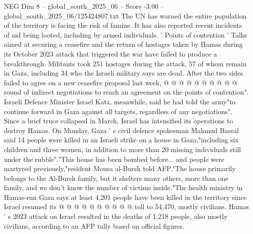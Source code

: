 \begin{textsample}{NEG Dim 8 – global\_south\_2025\_06 – Score -3.00 – global\_south\_2025\_06/125424807.txt}
The UN has warned the entire population of the territory is facing the risk of famine.
It has also reported recent incidents of aid being looted, including by armed individuals. ' Points of contention ' Talks aimed at securing a ceasefire and the return of hostages taken by Hamas during its October 2023 attack that triggered the war have failed to produce a breakthrough.
Militants took 251 hostages during the attack, 57 of whom remain in Gaza, including 34 who the Israeli military says are dead.
After the two sides failed to agree on a new ceasefire proposal last week, @ @ @ @ @ @ @ @ @ @ round of indirect negotiations to reach an agreement on the points of contention".
Israeli Defence Minister Israel Katz, meanwhile, said he had told the army"to continue forward in Gaza against all targets, regardless of any negotiations".
Since a brief truce collapsed in March, Israel has intensified its operations to destroy Hamas.
On Monday, Gaza ' s civil defence spokesman Mahmud Bassal said 14 people were killed in an Israeli strike on a house in Gaza,"including six children and three women, in addition to more than 20 missing individuals still under the rubble"."This house has been bombed before... and people were martyred previously,"resident Mousa al-Bursh told AFP."The house primarily belongs to the Al-Bursh family, but it shelters many others, more than one family, and we don't know the number of victims inside."The health ministry in Hamas-run Gaza says at least 4,201 people have been killed in the territory since Israel resumed its @ @ @ @ @ @ @ @ @ @ toll to 54,470, mostly civilians.
Hamas ' s 2023 attack on Israel resulted in the deaths of 1,218 people, also mostly civilians, according to an AFP tally based on official figures.

\end{textsample}
